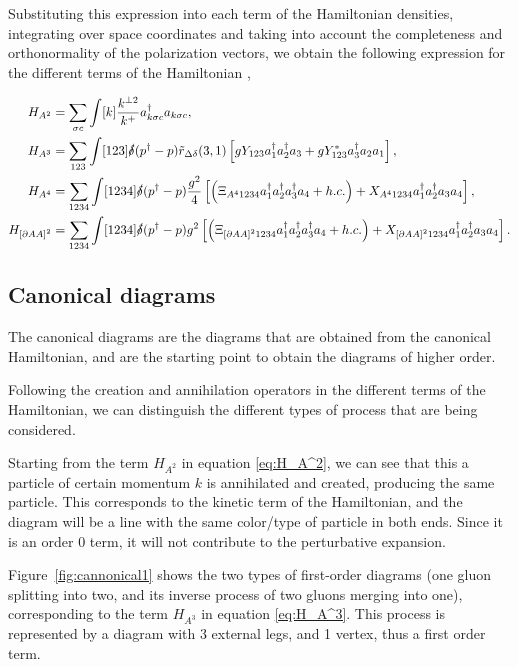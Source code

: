 \documentclass[11pt,a4paper,twoside,pdf]{article}
\numberwithin{equation}{section}
\begin{document}
Substituting this expression into each term of the Hamiltonian densities, integrating
over space coordinates and taking into account the completeness and orthonormality 
of the polarization vectors, we obtain the following expression for the different
terms of the Hamiltonian \cite{QCDG}, 

\begin{align}
    H_{A^2} &= \sum_{\sigma c} \int [k] \frac{k^{\perp 2}}{k^+}a^\dagger_{k\sigma c}
    a_{k\sigma c}, \label{eq:H_A^2}\\
    H_{A^3} &= \sum_{123} \int [123] \slashed{\delta}(p^\dagger - p) \tilde{r}_{\Delta \delta}
    (3, 1) \left[ gY_{123}a_1^\dagger a_2^\dagger a_3 + gY_{123}^*a_3^\dagger a_2 a_1 \right],
    \label{eq:H_A^3}\\
    H_{A^4} &= \sum_{1234} \int [1234] \slashed{\delta}(p^\dagger - p) \frac{g^2}{4}
    \left[ \left( \Xi_{A^4 1234} a_1^\dagger a_2^\dagger a_3^\dagger a_4 + h.c. \right)+ X_{A^4 1234} 
    a_1^\dagger a_2^\dagger a_3 a_4  \right], \label{eq:H_A^4}\\
    H_{\left[ \partial A A \right]^2} &= \sum_{1234} \int [1234] \slashed{\delta}
    (p^\dagger - p) g^2 \left[ \left( \Xi_{\left[ \partial A A \right]^2 1234}
    a_1^\dagger a_2^\dagger a_3^\dagger a_4 + h.c. \right) + X_{\left[ \partial A A \right]^2 
    1234} a_1^\dagger a_2^\dagger a_3 a_4  \right] \label{eq:H_partial}.
\end{align}

\subsection{Canonical diagrams}
The canonical diagrams are the diagrams that are obtained from the canonical
Hamiltonian, and are the starting point to obtain the diagrams of higher order.

Following the creation and annihilation operators in the different terms of the 
Hamiltonian, we can distinguish the different types of process that are being
considered. 

Starting from the term $H_{A^2}$ in equation \eqref{eq:H_A^2}, we can see that this 
a particle of certain momentum $k$ is annihilated and created, producing the same
particle. This corresponds to the kinetic term of the Hamiltonian, and the diagram 
will be a line with the same color/type of particle in both ends. Since it is an 
order 0 term, it will not contribute to the perturbative expansion.

Figure \ref{fig:cannonical1} shows the two types of first-order diagrams 
(one gluon splitting into two, and its inverse process of two gluons merging into one),
corresponding to the term $H_{A^3}$ in equation \eqref{eq:H_A^3}.
This process is represented by a diagram with 3 external legs, and 1 vertex, thus a 
first order term.
\end{document}
